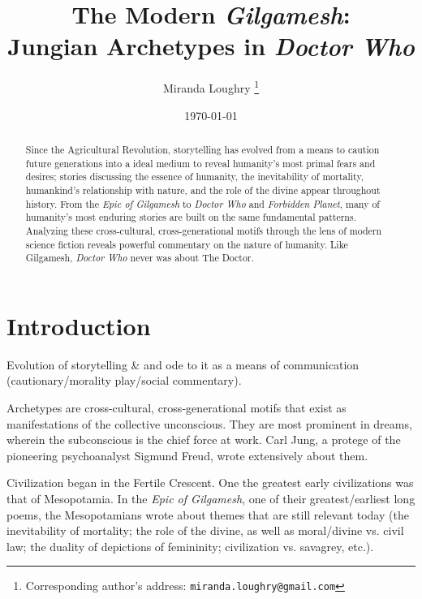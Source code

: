 \documentclass[10pt,a4paper]{article}
\begin{document}
\title{The Modern \emph{Gilgamesh}: \\
Jungian Archetypes in \emph{Doctor Who}}

\author{Miranda Loughry%
\thanks{Corresponding author's address: \texttt{miranda.loughry@gmail.com}}}

\date{\today}

\maketitle

\begin{abstract}
Since the Agricultural Revolution, storytelling
has evolved from a means to caution future
generations into a ideal medium to reveal
humanity's most primal fears and desires;
stories discussing the essence of humanity,
the inevitability of mortality, humankind's
relationship with nature, and the role of the
divine appear throughout history. From the
\emph{Epic of Gilgamesh} to \emph{Doctor Who}
and \emph{Forbidden Planet}, many of humanity's
most enduring stories are built on the same
fundamental patterns. Analyzing these
cross-cultural, cross-generational motifs
through the lens of modern science fiction
reveals powerful commentary on the nature of
humanity. Like Gilgamesh, \emph{Doctor Who}
never was about The Doctor.
\end{abstract}

\section{Introduction}
Evolution of storytelling & and ode to it as a means of communication (cautionary/morality play/social commentary).

Archetypes are cross-cultural, cross-generational motifs that exist as manifestations of the collective unconscious. They are most prominent in dreams, wherein the subconscious is the chief force at work. Carl Jung, a protege of the pioneering psychoanalyst Sigmund Freud, wrote extensively about them.
   
   Civilization began in the Fertile Crescent. One the greatest early civilizations was that of Mesopotamia. In the \emph{Epic of Gilgamesh}, one of their greatest/earliest long poems, the Mesopotamians wrote about themes that are still relevant today (the inevitability of mortality; the role of the divine, as well as moral/divine vs. civil law; the duality of depictions of femininity; civilization vs. savagrey, etc.). 
   
\end{document}
